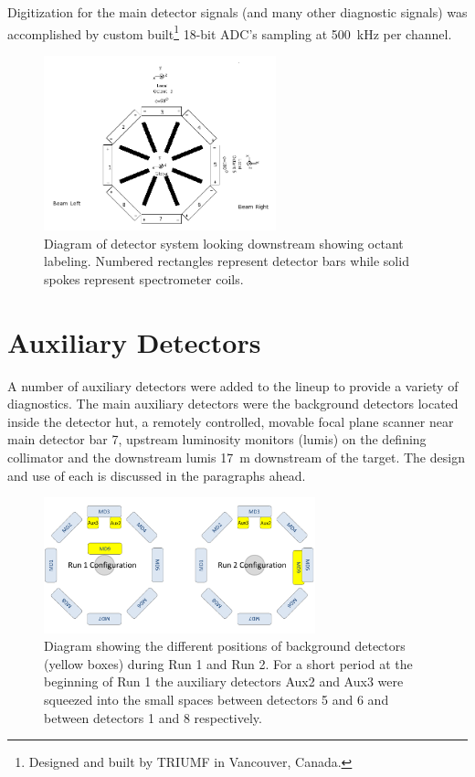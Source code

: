 Digitization for the main detector signals (and many other diagnostic signals) was accomplished by custom built\footnote{Designed and built by TRIUMF in Vancouver, Canada.} 18-bit ADC's sampling at 500~kHz per channel.  

\begin{figure}[ht]
\centering
\includegraphics[width=0.6\textwidth]{Pictures/octant_coordinates.png}
\caption{Diagram of \Qs detector system looking downstream showing octant labeling. Numbered rectangles represent detector bars while solid spokes represent spectrometer coils.}
\label{fig:octant_coords}
\end{figure}

\section{Auxiliary Detectors}
A number of auxiliary detectors were added to the \Qs lineup to provide a variety of diagnostics. The main auxiliary detectors were the background detectors located inside the detector hut, a remotely controlled, movable focal plane scanner near main detector bar 7, upstream luminosity monitors (lumis) on the defining collimator and the downstream lumis 17~m downstream of the target. The design and use of each is discussed in the paragraphs ahead.
\begin{figure}[ht]
\centering
\includegraphics[width=0.7\textwidth]{Pictures/background_detectors.pdf}
\caption{Diagram showing the different positions of background detectors (yellow boxes) during Run 1 and Run 2. For a short period at the beginning of Run 1 the auxiliary detectors Aux2 and Aux3 were squeezed into the small spaces between detectors 5 and 6 and between detectors 1 and 8 respectively.}
\label{fig:background_det}
\end{figure}

